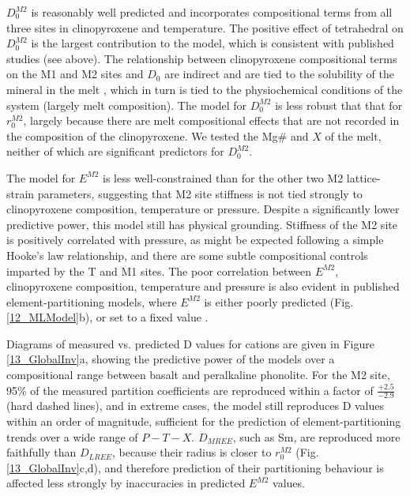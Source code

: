 \documentclass[review,authoryear,12pt]{elsarticle}
\begin{document}
$D_0^{M2}$ is reasonably well predicted and incorporates compositional terms from all three sites in clinopyroxene and temperature. The positive effect of tetrahedral  on $D_0^{M2}$ is the largest contribution to the model, which is consistent with published studies (see above). The relationship between clinopyroxene compositional terms on the M1  and M2 sites and $D_0$ are indirect and are tied to the solubility of the mineral in the melt \citep{Wood2003}, which in turn is tied to the physiochemical conditions of the system (largely melt composition). The model for $D_0^{M2}$ is less robust that that for $r_0^{M2}$, largely because there are melt compositional effects that are not recorded in the composition of the clinopyroxene. We tested the Mg\# and $X$ of the melt, neither of which are significant predictors for $D_0^{M2}$.

The model for $E^{M2}$ is less well-constrained than for the other two M2 lattice-strain parameters, suggesting that M2 site stiffness is not tied strongly to clinopyroxene composition, temperature or pressure. Despite a significantly lower predictive power, this model still has physical grounding. Stiffness of the M2 site is positively correlated with pressure, as might be expected following a simple Hooke's law relationship, and there are some subtle compositional controls imparted by the T and M1 sites. The poor correlation between $E^{M2}$, clinopyroxene composition, temperature and pressure is also evident in published element-partitioning models, where $E^{M2}$ is either poorly predicted (Fig. \ref{12_MLModel}b), or set to a fixed value \citep[e.g.][]{Dygert2014}.

Diagrams of measured vs. predicted D values for  cations are given in Figure \ref{13_GlobalInv}a, showing the predictive power of the models over a compositional range between basalt and peralkaline phonolite. For the M2 site, 95\% of the measured  partition coefficients are reproduced within a factor of $\frac{+ 2.5}{- 2.9}$ (hard dashed lines), and in extreme cases, the model still reproduces D values within an order of magnitude, sufficient for the prediction of element-partitioning trends over a wide range of $P-T-X$. $D_{MREE}$, such as Sm, are reproduced more faithfully than $D_{LREE}$, because their radius is closer to $r_0^{M2}$ (Fig. \ref{13_GlobalInv}c,d), and therefore prediction of their partitioning behaviour is affected less strongly by inaccuracies in predicted $E^{M2}$ values.

\end{document}
